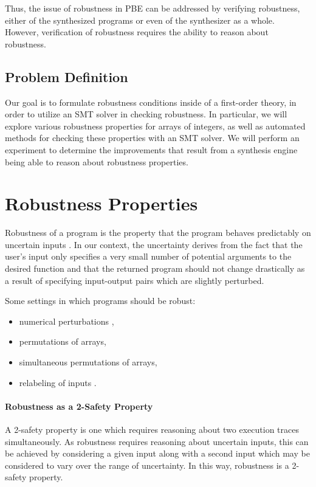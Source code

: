 \documentclass{llncs}
\begin{document}
Thus, the issue of robustness in PBE can be addressed by verifying robustness, either of the synthesized programs or even of the synthesizer as a whole.  However, verification of robustness requires the ability to reason about robustness.

\subsection{Problem Definition}

Our goal is to formulate robustness conditions inside of a first-order theory, in order to utilize an SMT solver in checking robustness.  In particular, we will explore various robustness properties for arrays of integers, as well as automated methods for checking these properties with an SMT solver.  We will perform an experiment to determine the improvements that result from a synthesis engine being able to reason about robustness properties.

\section{Robustness Properties}

Robustness of a program is the property that the program behaves predictably on uncertain inputs \cite{chaudhuri12}.  In our context, the uncertainty derives from the fact that the user's input only specifies a very small number of potential arguments to the desired function and that the returned program should not change drastically as a result of specifying input-output pairs which are slightly perturbed.

Some settings in which programs should be robust:
\begin{itemize}
\item numerical perturbations \cite{samanta14,chaudhuri10,chaudhuri11},
\item permutations of arrays,
\item simultaneous permutations of arrays,
\item relabeling of inputs \cite{zapponi03}.
\end{itemize}

\paragraph{Robustness as a 2-Safety Property}
A 2-safety property is one which requires reasoning about two execution traces simultaneously.  As robustness requires reasoning about uncertain inputs, this can be achieved by considering a given input along with a second input which may be considered to vary over the range of uncertainty.  In this way, robustness is a 2-safety property.
\end{document}
